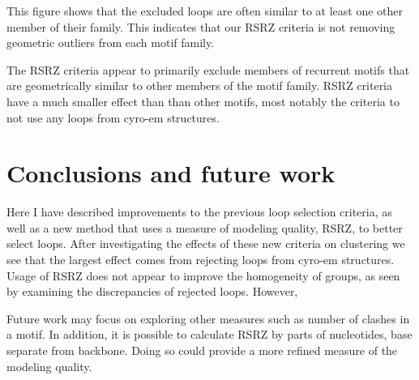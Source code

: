 This figure shows that the excluded loops are often similar to at least one
other member of their family. This indicates that our RSRZ criteria is not
removing geometric outliers from each motif family. 

The RSRZ criteria appear to primarily exclude members of recurrent motifs that
are geometrically similar to other members of the motif family. RSRZ criteria
have a much smaller effect than than other motifs, most notably the criteria to
not use any loops from cyro-em structures. 

\section{Conclusions and future work}

Here I have described improvements to the previous loop selection criteria, as
well as a new method that uses a measure of modeling quality, RSRZ, to better
select loops. After investigating the effects of these new criteria on
clustering we see that the largest effect comes from rejecting loops from
cyro-em structures. Usage of RSRZ does not appear to improve the homogeneity of
groups, as seen by examining the discrepancies of rejected loops. However, 

Future work may focus on exploring other measures such as number of clashes in a
motif. In addition, it is possible to calculate RSRZ by parts of nucleotides,
base separate from backbone. Doing so could provide a more refined measure of
the modeling quality.
